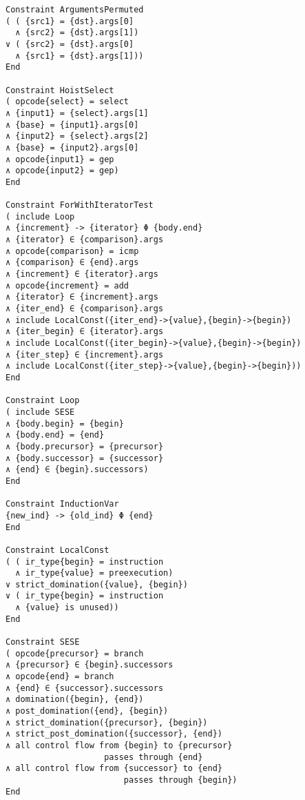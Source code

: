 \begin{lstlisting}[language=CAnDL,basicstyle=\linespread{0.85}\small\ttfamily]
Constraint ArgumentsPermuted
( ( {src1} = {dst}.args[0]
  ∧ {src2} = {dst}.args[1])
∨ ( {src2} = {dst}.args[0]
  ∧ {src1} = {dst}.args[1]))
End

Constraint HoistSelect
( opcode{select} = select
∧ {input1} = {select}.args[1]
∧ {base} = {input1}.args[0]
∧ {input2} = {select}.args[2]
∧ {base} = {input2}.args[0]
∧ opcode{input1} = gep
∧ opcode{input2} = gep)
End

Constraint ForWithIteratorTest
( include Loop
∧ {increment} -> {iterator} Φ {body.end}
∧ {iterator} ∈ {comparison}.args
∧ opcode{comparison} = icmp
∧ {comparison} ∈ {end}.args
∧ {increment} ∈ {iterator}.args
∧ opcode{increment} = add
∧ {iterator} ∈ {increment}.args
∧ {iter_end} ∈ {comparison}.args
∧ include LocalConst({iter_end}->{value},{begin}->{begin})
∧ {iter_begin} ∈ {iterator}.args
∧ include LocalConst({iter_begin}->{value},{begin}->{begin})
∧ {iter_step} ∈ {increment}.args
∧ include LocalConst({iter_step}->{value},{begin}->{begin}))
End

Constraint Loop
( include SESE
∧ {body.begin} = {begin}
∧ {body.end} = {end}
∧ {body.precursor} = {precursor}
∧ {body.successor} = {successor}
∧ {end} ∈ {begin}.successors)
End

Constraint InductionVar
{new_ind} -> {old_ind} Φ {end}
End

Constraint LocalConst
( ( ir_type{begin} = instruction
  ∧ ir_type{value} = preexecution)
∨ strict_domination({value}, {begin})
∨ ( ir_type{begin} = instruction
  ∧ {value} is unused))
End

Constraint SESE
( opcode{precursor} = branch
∧ {precursor} ∈ {begin}.successors
∧ opcode{end} = branch
∧ {end} ∈ {successor}.successors
∧ domination({begin}, {end})
∧ post_domination({end}, {begin})
∧ strict_domination({precursor}, {begin})
∧ strict_post_domination({successor}, {end})
∧ all control flow from {begin} to {precursor}
                    passes through {end}
∧ all control flow from {successor} to {end}
                        passes through {begin})
End
\end{lstlisting}
